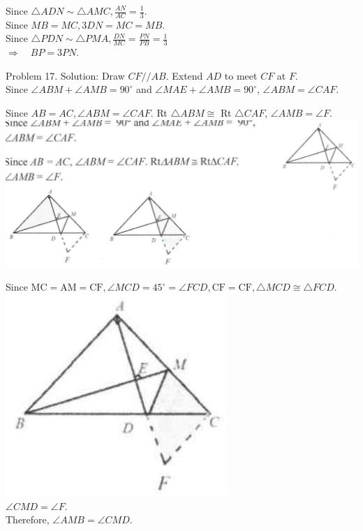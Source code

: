 \documentclass[10pt]{article}
\begin{document}
Since \(\triangle A D N \sim \triangle A M C, \frac{A N}{A C}=\frac{1}{3}\).\\
Since \(M B=M C, 3 D N=M C=M B\).\\
Since \(\triangle P D N \sim \triangle P M A, \frac{D N}{M C}=\frac{P N}{P B}=\frac{1}{3}\)\\
\(\Rightarrow \quad B P=3 P N\).

Problem 17. Solution:
Draw \(C F / / A B\). Extend \(A D\) to meet \(C F\) at \(F\).\\
Since \(\angle A B M+\angle A M B=90^{\circ}\) and \(\angle M A E+\angle A M B=90^{\circ}\), \(\angle A B M=\angle C A F\).

Since \(A B=A C, \angle A B M=\angle C A F\). Rt \(\triangle A B M \cong\) Rt \(\triangle C A F\), \(\angle A M B=\angle F\).\\
\includegraphics[max width=\textwidth, center]{2025_04_17_97bc1f7e44d93c271a88g-139(1)}


Since \(\mathrm{MC}=\mathrm{AM}=\mathrm{CF}, \angle M C D=45^{\circ}=\angle F C D, \mathrm{CF}=\mathrm{CF}, \triangle M C D \cong \triangle F C D\).\\
\includegraphics[max width=\textwidth, center]{2025_04_17_97bc1f7e44d93c271a88g-140(2)}\\
\(\angle C M D=\angle F\).\\
Therefore, \(\angle A M B=\angle C M D\).
\end{document}
